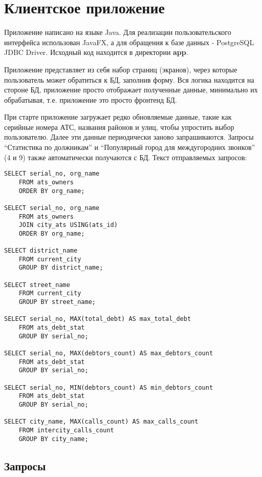 \documentclass{report}
\begin{document}
\chapter{Клиентское приложение}

Приложение написано на языке Java. Для реализации пользовательского
интерфейса использован JavaFX, а для обращения к базе 
данных - PostgreSQL JDBC Driver. Исходный код находится в директории 
\textbf{app}.

Приложение представляет из себя набор страниц (экранов), 
через которые пользователь может обратиться к БД, 
заполнив форму. Вся логика находится на стороне БД, 
приложение просто отображает полученные данные, минимально
их обрабатывая, т.е. приложение это просто фронтенд БД.

При старте приложение загружает редко обновляемые данные, 
такие как серийные номера АТС, названия районов и улиц, 
чтобы упростить выбор пользователю. 
Далее эти данные периодически заново запрашиваются.
Запросы ``Статистика по должникам'' и 
``Популярный город для междугородних звонков'' (4 и 9) 
также автоматически получаются с БД. Текст отправляемых запросов:

\begin{lstlisting}
SELECT serial_no, org_name
	FROM ats_owners
	ORDER BY org_name;

SELECT serial_no, org_name
	FROM ats_owners
	JOIN city_ats USING(ats_id)
	ORDER BY org_name;

SELECT district_name
	FROM current_city
	GROUP BY district_name;

SELECT street_name
	FROM current_city
	GROUP BY street_name;

SELECT serial_no, MAX(total_debt) AS max_total_debt
	FROM ats_debt_stat
	GROUP BY serial_no;

SELECT serial_no, MAX(debtors_count) AS max_debtors_count
	FROM ats_debt_stat
	GROUP BY serial_no;

SELECT serial_no, MIN(debtors_count) AS min_debtors_count
	FROM ats_debt_stat
	GROUP BY serial_no;

SELECT city_name, MAX(calls_count) AS max_calls_count
	FROM intercity_calls_count
	GROUP BY city_name;
\end{lstlisting}

\section{Запросы}
\end{document}
